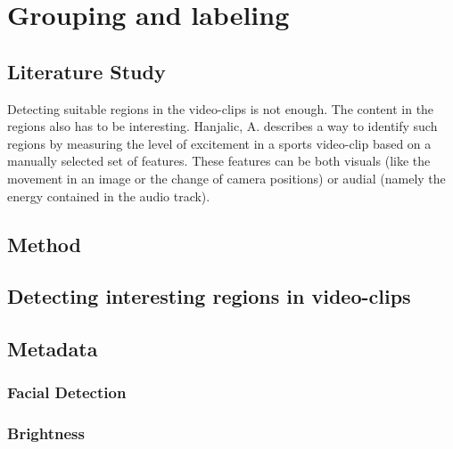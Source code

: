 %
\section{Grouping and labeling}
%

%
\subsection{Literature Study}
%
Detecting suitable regions in the video-clips is not enough. The content in the regions also has to be interesting. Hanjalic, A. \cite{citeulike:405480} describes a way to identify such regions by measuring the level of excitement in a sports video-clip based on a manually selected set of features. These features can be both visuals (like the movement in an image or the change of camera positions) or audial (namely the energy contained in the audio track).%
%
\subsection{Method}
%

%
\subsection{Detecting interesting regions in video-clips}
%

%
\subsection{Metadata}
%

%
\subsubsection{Facial Detection}
%

%
\subsubsection{Brightness}
%

